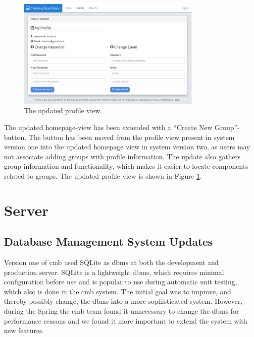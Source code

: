 \begin{figure}[h!]
    \centering
    \includegraphics[width=0.8\textwidth]{figs/new_profile.jpg}
    \caption[The updated profile view]{The updated profile view.}
    \label{fig:new-profile}
\end{figure}

The updated homepage-view has been extended with a ``Create New Group''-button. The button has been moved from the profile view present in system version one into the updated homepage view in system version two, as users may not associate adding groups with profile information. The update also gathers group information and functionality, which makes it easier to locate components related to groups. The updated profile view is shown in Figure \ref{fig:new-profile}.

\section{Server}
\label{sec:impr-server}
\subsection{Database Management System Updates}
\label{sub-sec:impr-dbms}
Version one of \gls{cmb} used SQLite \cite{SQLITE} as \gls{dbms} at both the development and production server. SQLite is a lightweight \gls{dbms}, which requires minimal configuration before use and is popular to use during automatic unit testing, which also is done in the \gls{cmb} system. The initial goal was to improve, and thereby possibly change, the \gls{dbms} into a more sophisticated system. However, during the Spring the \gls{cmb} team found it unnecessary to change the \gls{dbms} for performance reasons and we found it more important to extend the system with new features. \\

